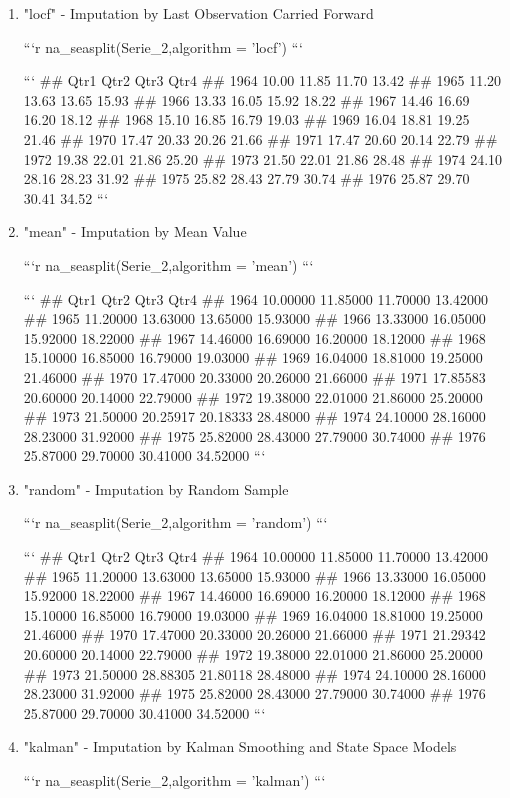 \documentclass[
]{article}
\begin{document}
\begin{enumerate}
\begin{enumerate}
\item "locf" - Imputation by Last Observation Carried Forward

```r
na_seasplit(Serie_2,algorithm = 'locf')
```

```
##       Qtr1  Qtr2  Qtr3  Qtr4
## 1964 10.00 11.85 11.70 13.42
## 1965 11.20 13.63 13.65 15.93
## 1966 13.33 16.05 15.92 18.22
## 1967 14.46 16.69 16.20 18.12
## 1968 15.10 16.85 16.79 19.03
## 1969 16.04 18.81 19.25 21.46
## 1970 17.47 20.33 20.26 21.66
## 1971 17.47 20.60 20.14 22.79
## 1972 19.38 22.01 21.86 25.20
## 1973 21.50 22.01 21.86 28.48
## 1974 24.10 28.16 28.23 31.92
## 1975 25.82 28.43 27.79 30.74
## 1976 25.87 29.70 30.41 34.52
```
\item "mean" - Imputation by Mean Value

```r
na_seasplit(Serie_2,algorithm = 'mean')
```

```
##          Qtr1     Qtr2     Qtr3     Qtr4
## 1964 10.00000 11.85000 11.70000 13.42000
## 1965 11.20000 13.63000 13.65000 15.93000
## 1966 13.33000 16.05000 15.92000 18.22000
## 1967 14.46000 16.69000 16.20000 18.12000
## 1968 15.10000 16.85000 16.79000 19.03000
## 1969 16.04000 18.81000 19.25000 21.46000
## 1970 17.47000 20.33000 20.26000 21.66000
## 1971 17.85583 20.60000 20.14000 22.79000
## 1972 19.38000 22.01000 21.86000 25.20000
## 1973 21.50000 20.25917 20.18333 28.48000
## 1974 24.10000 28.16000 28.23000 31.92000
## 1975 25.82000 28.43000 27.79000 30.74000
## 1976 25.87000 29.70000 30.41000 34.52000
```
\item "random" - Imputation by Random Sample

```r
na_seasplit(Serie_2,algorithm = 'random')
```

```
##          Qtr1     Qtr2     Qtr3     Qtr4
## 1964 10.00000 11.85000 11.70000 13.42000
## 1965 11.20000 13.63000 13.65000 15.93000
## 1966 13.33000 16.05000 15.92000 18.22000
## 1967 14.46000 16.69000 16.20000 18.12000
## 1968 15.10000 16.85000 16.79000 19.03000
## 1969 16.04000 18.81000 19.25000 21.46000
## 1970 17.47000 20.33000 20.26000 21.66000
## 1971 21.29342 20.60000 20.14000 22.79000
## 1972 19.38000 22.01000 21.86000 25.20000
## 1973 21.50000 28.88305 21.80118 28.48000
## 1974 24.10000 28.16000 28.23000 31.92000
## 1975 25.82000 28.43000 27.79000 30.74000
## 1976 25.87000 29.70000 30.41000 34.52000
```
\item "kalman" - Imputation by Kalman Smoothing and State Space Models

```r
na_seasplit(Serie_2,algorithm = 'kalman')
```


\end{enumerate}
\end{enumerate}
\end{document}

